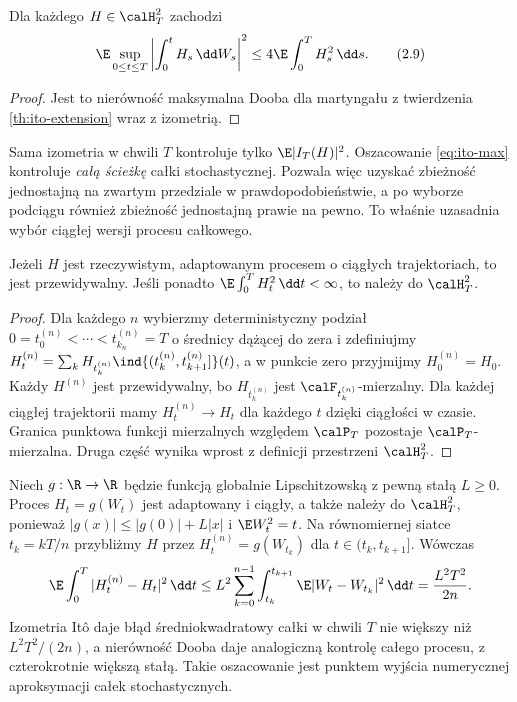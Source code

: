 \begin{wniosek}
Dla każdego $H\in\calH_T^2$ zachodzi
\[
\E\sup_{0\le t\le T}\left|\int_0^tH_s\,\dd W_s\right|^2
\le4\E\int_0^TH_s^2\,\dd s.
\tag{2.9}\label{eq:ito-max}
\]
\end{wniosek}
\begin{proof}
Jest to nierówność maksymalna Dooba dla martyngału
z twierdzenia \ref{th:ito-extension} wraz z izometrią.
\end{proof}

\begin{uwaga}
Sama izometria w chwili $T$ kontroluje tylko
$\E|I_T(H)|^2$. Oszacowanie \eqref{eq:ito-max}
kontroluje \emph{całą ścieżkę} całki stochastycznej.
Pozwala więc uzyskać zbieżność jednostajną na zwartym
przedziale w prawdopodobieństwie, a po wyborze podciągu
również zbieżność jednostajną prawie na pewno. To właśnie
uzasadnia wybór ciągłej wersji procesu całkowego.
\end{uwaga}


\begin{lemat}
Jeżeli $H$ jest rzeczywistym, adaptowanym procesem
o ciągłych trajektoriach, to jest przewidywalny.
Jeśli ponadto $\E\int_0^TH_t^2\,\dd t<\infty$,
to należy do $\calH_T^2$.
\end{lemat}
\begin{proof}
Dla każdego $n$ wybierzmy deterministyczny podział
$0=t_0^{(n)}<\cdots<t_{k_n}^{(n)}=T$ o średnicy
dążącej do zera i zdefiniujmy
$H_t^{(n)}=\sum_k H_{t_k^{(n)}}
\ind{(t_k^{(n)},t_{k+1}^{(n)}]}(t)$,
a w punkcie zero przyjmijmy $H_0^{(n)}=H_0$.
Każdy $H^{(n)}$ jest przewidywalny, bo
$H_{t_k^{(n)}}$ jest $\calF_{t_k^{(n)}}$-mierzalny.
Dla każdej ciągłej trajektorii mamy
$H_t^{(n)}\to H_t$ dla każdego $t$ dzięki
ciągłości w czasie. Granica punktowa funkcji
mierzalnych względem $\calP_T$ pozostaje
$\calP_T$-mierzalna. Druga część wynika wprost
z definicji przestrzeni $\calH_T^2$.
\end{proof}

\begin{przyklad}[Aproksymacja $H_t=g(W_t)$ i jej dokładność]
Niech $g:\R\to\R$ będzie funkcją globalnie Lipschitzowską
z pewną stałą $L\ge0$. Proces $H_t=g(W_t)$ jest
adaptowany i ciągły, a także należy do $\calH_T^2$,
ponieważ $|g(x)|\le|g(0)|+L|x|$ i
$\E W_t^2=t$. Na równomiernej siatce $t_k=kT/n$
przybliżmy $H$ przez
$H_t^{(n)}=g(W_{t_k})$ dla $t\in(t_k,t_{k+1}]$.
Wówczas
\[
\E\int_0^T|H_t^{(n)}-H_t|^2\,\dd t
\le L^2\sum_{k=0}^{n-1}\int_{t_k}^{t_{k+1}}
\E|W_t-W_{t_k}|^2\,\dd t
=\frac{L^2T^2}{2n}.
\]
Izometria Itô daje błąd średniokwadratowy całki
w chwili $T$ nie większy niż $L^2T^2/(2n)$,
a nierówność Dooba daje analogiczną kontrolę
całego procesu, z czterokrotnie większą stałą.
Takie oszacowanie jest punktem wyjścia
numerycznej aproksymacji całek stochastycznych.
\end{przyklad}

